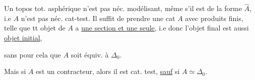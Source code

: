 Un topos  tot. asphérique n'est pas néc. modélisant, même s'il est de la forme $\widehat A$, i.e $A$ n'est pas néc. cat-test.  Il suffit de prendre une cat $A$ avec  produits finis, telle que tt objet de $A$ a \uline{une section et une seule}, i.e donc l'objet final est aussi \uline{objet initial},


sans pour cela que $A$ soit équiv. à $\Delta_0$.

Mais si $A$ est un contracteur, alors il est cat. test, \uline{sauf} si $A\simeq\Delta_0$.
